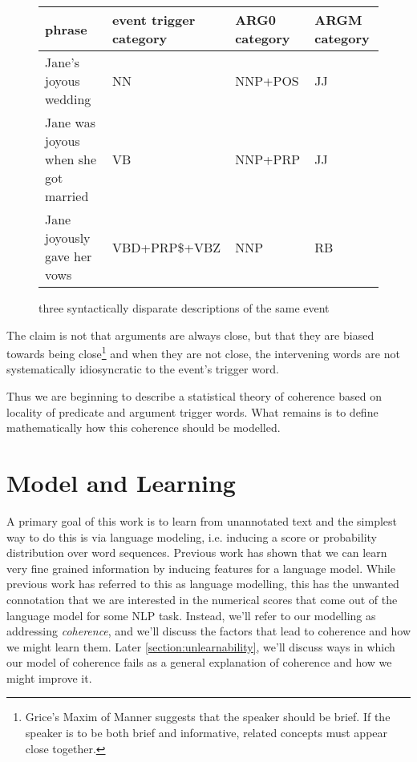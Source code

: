 \documentclass[11pt,letterpaper]{article}
\begin{document}
% 
\begin{figure*}[ht]
\begin{tabular}{ | l | l | l | l | }
\hline
phrase & event trigger category & ARG0 category & ARGM category \\
\hline
Jane's joyous wedding & NN & NNP+POS & JJ \\
Jane was joyous when she got married & VB & NNP+PRP & JJ \\
Jane joyously gave her vows & VBD+PRP\$+VBZ & NNP & RB \\
\hline
\end{tabular}
\caption{three syntactically disparate descriptions of the same event}
\label{eventDesc}
\end{figure*}


The claim is not that arguments are always close, but
that they are biased towards being close\footnote{Grice's Maxim of Manner suggests
that the speaker should be brief. If the speaker is to be both brief and informative,
related concepts must appear close together.}
and when they are not close, the intervening words are not
systematically idiosyncratic to the event's trigger word.

Thus we are beginning to describe a statistical theory of coherence
based on locality of predicate and argument trigger words.
What remains is to define mathematically how this coherence should be modelled.


\section{Model and Learning} %



A primary goal of this work is to learn from unannotated text and
the simplest way to do this is via language modeling, i.e. inducing
a score or probability distribution over word sequences.
Previous work has shown that we can learn very fine grained information
by inducing features for a language model.
While previous work has referred to this as language modelling,
this has the unwanted connotation that we are interested in the
numerical scores that come out of the language model for some NLP task.
Instead, we'll refer to our modelling as addressing {\em coherence},
and we'll discuss the factors that lead to coherence and how we might learn them. 
Later \ref{section:unlearnability}, we'll discuss ways in which our model of coherence
fails as a general explanation of coherence and how we might improve it.
\end{document}

